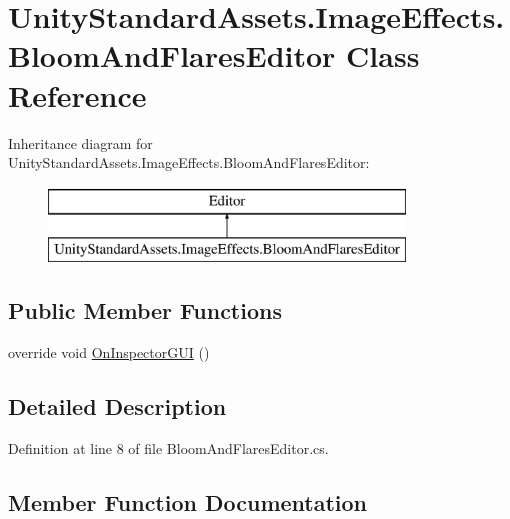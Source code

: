 \hypertarget{class_unity_standard_assets_1_1_image_effects_1_1_bloom_and_flares_editor}{}\section{Unity\+Standard\+Assets.\+Image\+Effects.\+Bloom\+And\+Flares\+Editor Class Reference}
\label{class_unity_standard_assets_1_1_image_effects_1_1_bloom_and_flares_editor}
Inheritance diagram for Unity\+Standard\+Assets.\+Image\+Effects.\+Bloom\+And\+Flares\+Editor\+:\begin{figure}[H]
\begin{center}
\leavevmode
\includegraphics[height=2.000000cm]{class_unity_standard_assets_1_1_image_effects_1_1_bloom_and_flares_editor}
\end{center}
\end{figure}
\subsection*{Public Member Functions}
\begin{DoxyCompactItemize}
\item 
override void \mbox{\hyperlink{class_unity_standard_assets_1_1_image_effects_1_1_bloom_and_flares_editor_acb29dfb0f97c2dd5fd9ae3c83c2e27e1}{On\+Inspector\+G\+UI}} ()
\end{DoxyCompactItemize}


\subsection{Detailed Description}


Definition at line 8 of file Bloom\+And\+Flares\+Editor.\+cs.



\subsection{Member Function Documentation}
\mbox{\label{class_unity_standard_assets_1_1_image_effects_1_1_bloom_and_flares_editor_acb29dfb0f97c2dd5fd9ae3c83c2e27e1}} 
